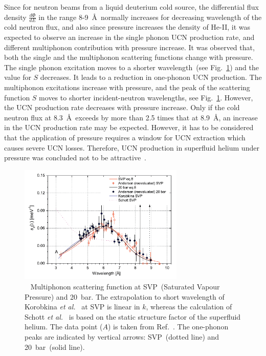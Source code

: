 Since for neutron beams from a liquid deuterium cold source, the
differential flux density $\frac{d\Phi}{dE}$ in the range
8-9~\AA~normally increases for decreasing wavelength of the cold
neutron flux, and also since pressure increases the density of He-II,
it was expected to observe an increase in the single phonon UCN
production rate, and different multiphonon contribution with pressure
increase.  It was observed that, both the single and the multiphonon
scattering functions change with pressure. The single phonon
excitation moves to a shorter wavelength~(see
Fig.~\ref{fig:Schmidt_S}) and the value for $S$ decreases. It leads to
a reduction in one-phonon UCN production.  The multiphonon excitations
increase with pressure, and the peak of the scattering function $S$
moves to shorter incident-neutron wavelengths, see
Fig.~\ref{fig:Schmidt_S}. However, the UCN production rate decreases
with pressure increase.  Only if the cold neutron flux at
8.3~\AA~exceeds by more than 2.5 times that at 8.9~\AA, an increase in
the UCN production rate may be expected. However, it has to be
considered that the application of pressure requires a window for UCN
extraction which causes severe UCN losses. Therefore, UCN production
in superfluid helium under pressure was concluded not to be
attractive~\cite{Schmidt2009}.




\begin{figure}[h!]
\begin{center}
   \includegraphics[width=0.7\textwidth]{Schmidt_S.PNG}
   \caption[Multiphonon scattering function of superfluid helium at
   differnet pressures]{~\cite{Schmidt2009} Multiphonon scattering
     function at SVP~(Saturated Vapour Pressure) and 20~bar. The
     extrapolation to short wavelength of Korobkina {\it {et
         al.}}~\cite{Korobkina2002} at SVP is linear in $k$, whereas
     the calculation of Schott {\it {et al.}}~\cite{Schott2003} is
     based on the static structure factor of the superfluid
     helium. The data point ($A$) is taken from
     Ref.~\cite{Fak1991}. The one-phonon peaks are indicated by
     vertical arrows: SVP~(dotted line) and 20~bar~(solid line).  }
    \label{fig:Schmidt_S}
    \end{center}
\end{figure} 



